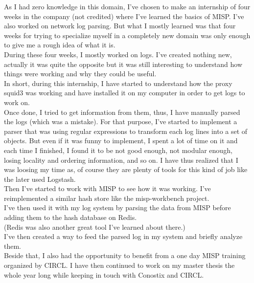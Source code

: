 \documentclass{eplmastersthesis}
\begin{document}
As I had zero knowledge in this domain, I've chosen to make an internship of four weeks in the company (not credited) where I've learned the basics of MISP. I've also worked on network log parsing. But what I mostly learned was that four weeks for trying to specialize myself in a completely new domain was only enough to give me a rough idea of what it is.\\
During these four weeks, I mostly worked on logs. I've created nothing new, actually it was quite the opposite but it was still interesting to understand how things were working and why they could be useful. \\
In short, during this internship, I have started to understand how the proxy squid3 was working and have installed it on my computer in order to get logs to work on.\\
Once done, I tried to get information from them, thus, I have manually parsed the logs (which was a mistake). For that purpose, I've started to implement a parser that was using regular expressions to transform each log lines into a set of objects. But even if it was funny to implement, I spent a lot of time on it and each time I finished, I found it to be not good enough, not modular enough, losing locality and ordering information, and so on. I have thus realized that I was loosing my time as, of course they are plenty of tools for this kind of job like the later used Logstash.\\
Then I've started to work with MISP to see how it was working. I've reimplemented a similar hash store like the misp-workbench project.\\
I've then used it with my log system by parsing the data from MISP before adding them to the hash database on Redis.\\
(Redis was also another great tool I've learned about there.)\\
I've then created a way to feed the parsed log in my system and briefly analyze them.\\
Beside that, I also had the opportunity to benefit from a one day MISP training organized by CIRCL.
I have then continued to work on my master thesis the whole year long while keeping in touch with Conostix and CIRCL.
\end{document}

